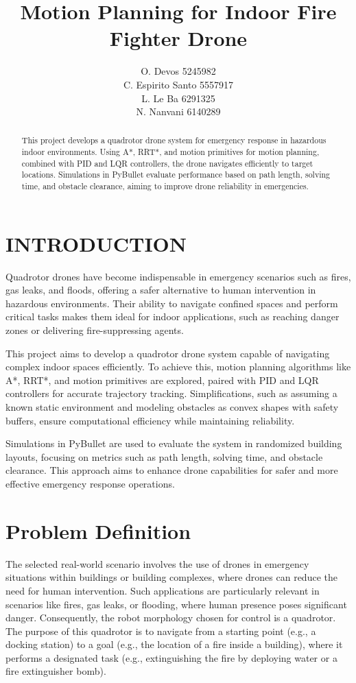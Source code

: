 \documentclass[a4paper, 11pt, conference]{ieeeconf}      %
\title{\vspace{-25pt}\LARGE \bf
Motion Planning for Indoor Fire Fighter Drone
}
\author{O. Devos 5245982 \\ C. Espirito Santo 5557917 \\ L. Le Ba 6291325 \\ N. Nanvani 6140289}%
\begin{document}
\maketitle
\thispagestyle{empty}
\pagestyle{empty}


\begin{abstract}

This project develops a quadrotor drone system for emergency response in hazardous indoor environments. Using A*, RRT*, and motion primitives for motion planning, combined with PID and LQR controllers, the drone navigates efficiently to target locations. Simulations in PyBullet evaluate performance based on path length, solving time, and obstacle clearance, aiming to improve drone reliability in emergencies.

\end{abstract}

\section{INTRODUCTION}
Quadrotor drones have become indispensable in emergency scenarios such as fires, gas leaks, and floods, offering a safer alternative to human intervention in hazardous environments. Their ability to navigate confined spaces and perform critical tasks makes them ideal for indoor applications, such as reaching danger zones or delivering fire-suppressing agents.

This project aims to develop a quadrotor drone system capable of navigating complex indoor spaces efficiently. To achieve this, motion planning algorithms like A*, RRT*, and motion primitives are explored, paired with PID and LQR controllers for accurate trajectory tracking. Simplifications, such as assuming a known static environment and modeling obstacles as convex shapes with safety buffers, ensure computational efficiency while maintaining reliability.

Simulations in PyBullet are used to evaluate the system in randomized building layouts, focusing on metrics such as path length, solving time, and obstacle clearance. This approach aims to enhance drone capabilities for safer and more effective emergency response operations.

\section{Problem Definition}
The selected real-world scenario involves the use of drones in emergency situations within buildings or building complexes, where drones can reduce the need for human intervention. Such applications are particularly relevant in scenarios like fires, gas leaks, or flooding, where human presence poses significant danger. Consequently, the robot morphology chosen for control is a quadrotor. The purpose of this quadrotor is to navigate from a starting point (e.g., a docking station) to a goal (e.g., the location of a fire inside a building), where it performs a designated task (e.g., extinguishing the fire by deploying water or a fire extinguisher bomb).
\end{document}

